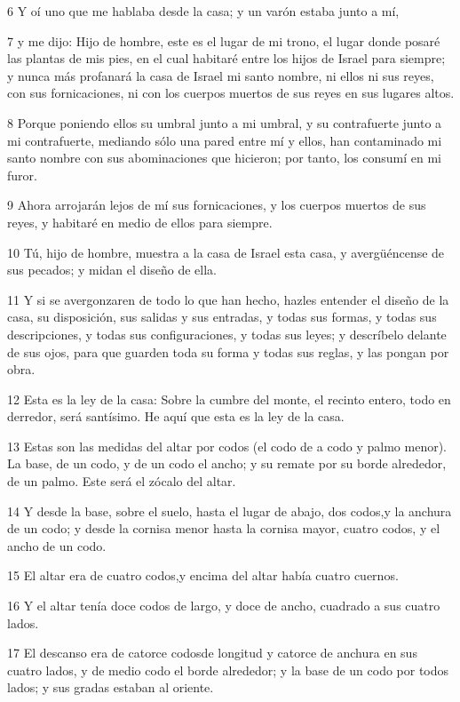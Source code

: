 \par 6 Y oí uno que me hablaba desde la casa; y un varón estaba junto a mí,
\par 7 y me dijo: Hijo de hombre, este es el lugar de mi trono, el lugar donde posaré las plantas de mis pies, en el cual habitaré entre los hijos de Israel para siempre; y nunca más profanará la casa de Israel mi santo nombre, ni ellos ni sus reyes, con sus fornicaciones, ni con los cuerpos muertos de sus reyes en sus lugares altos.
\par 8 Porque poniendo ellos su umbral junto a mi umbral, y su contrafuerte junto a mi contrafuerte, mediando sólo una pared entre mí y ellos, han contaminado mi santo nombre con sus abominaciones que hicieron; por tanto, los consumí en mi furor.
\par 9 Ahora arrojarán lejos de mí sus fornicaciones, y los cuerpos muertos de sus reyes, y habitaré en medio de ellos para siempre.
\par 10 Tú, hijo de hombre, muestra a la casa de Israel esta casa, y avergüéncense de sus pecados; y midan el diseño de ella.
\par 11 Y si se avergonzaren de todo lo que han hecho, hazles entender el diseño de la casa, su disposición, sus salidas y sus entradas, y todas sus formas, y todas sus descripciones, y todas sus configuraciones, y todas sus leyes; y descríbelo delante de sus ojos, para que guarden toda su forma y todas sus reglas, y las pongan por obra.
\par 12 Esta es la ley de la casa: Sobre la cumbre del monte, el recinto entero, todo en derredor, será santísimo. He aquí que esta es la ley de la casa.
\par 13 Estas son las medidas del altar por codos (el codo de a codo y palmo menor). La base, de un codo, y de un codo el ancho; y su remate por su borde alrededor, de un palmo. Este será el zócalo del altar.
\par 14 Y desde la base, sobre el suelo, hasta el lugar de abajo, dos codos,y la anchura de un codo; y desde la cornisa menor hasta la cornisa mayor, cuatro codos, y el ancho de un codo.
\par 15 El altar era de cuatro codos,y encima del altar había cuatro cuernos.
\par 16 Y el altar tenía doce codos de largo, y doce de ancho, cuadrado a sus cuatro lados.
\par 17 El descanso era de catorce codosde longitud y catorce de anchura en sus cuatro lados, y de medio codo el borde alrededor; y la base de un codo por todos lados; y sus gradas estaban al oriente. 
